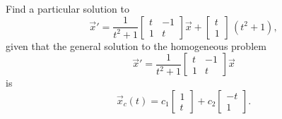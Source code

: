 \documentclass{ximera}
\begin{document}
\begin{example}
    Find a particular solution to
    \begin{equation} \label{nhsys:vcexeq}
        {\vec{x}}' = \frac{1}{t^2+1}
        \begin{bmatrix}
            t & -1 \\
            1 & t
        \end{bmatrix}
        \vec{x} + 
        \begin{bmatrix} 
            t \\ 
            1 
        \end{bmatrix} 
        \,(t^2+1),
    \end{equation} 
    given that the general solution to the homogeneous problem 
    \begin{equation*} 
        {\vec{x}}' = \frac{1}{t^2+1}
        \begin{bmatrix}
            t & -1 \\
            1 & t
        \end{bmatrix}
        \vec{x}
    \end{equation*} is
    \begin{equation*}
        \vec{x}_c(t) = c_1 \begin{bmatrix} 1 \\ t \end{bmatrix} + c_2 \begin{bmatrix} -t \\ 1 \end{bmatrix}.
    \end{equation*}
\end{example}
\end{document}

